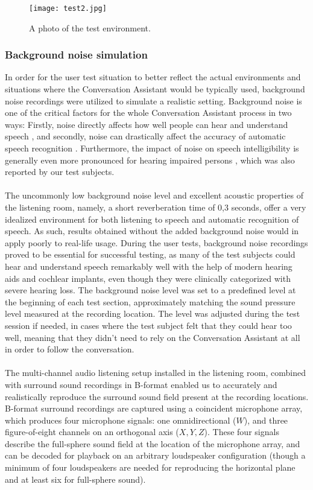 \documentclass[english, 12pt, a4paper, pdftex, elec, utf8]{aaltothesis}
\begin{document}
\begin{figure}[h]
	\centering
	\texttt{[image: test2.jpg]}
	\caption{A photo of the test environment.}
	\label{fig:photo}
\end{figure}

\subsubsection{Background noise simulation}

In order for the user test situation to better reflect the actual environments and situations where the Conversation Assistant would be typically used, background noise recordings were utilized to simulate a realistic setting. Background noise is one of the critical factors for the whole Conversation Assistant process in two ways: Firstly, noise directly affects how well people can hear and understand speech \cite{pulkki2015communication}, and secondly, noise can drastically affect the accuracy of automatic speech recognition \cite{kallasjoki2016}. Furthermore, the impact of noise on speech intelligibility is generally even more pronounced for hearing impaired persons \cite{healy2016difficulty}, which was also reported by our test subjects. \\\\
The uncommonly low background noise level and excellent acoustic properties of the listening room, namely, a short reverberation time of 0,3 seconds, offer a very idealized environment for both listening to speech and automatic recognition of speech. As such, results obtained without the added background noise would in apply poorly to real-life usage. During the user tests, background noise recordings proved to be essential for successful testing, as many of the test subjects could hear and understand speech remarkably well with the help of modern hearing aids and cochlear implants, even though they were clinically categorized with severe hearing loss. The background noise level was set to a predefined level at the beginning of each test section, approximately matching the sound pressure level measured at the recording location. The level was adjusted during the test session if needed, in cases where the test subject felt that they could hear too well, meaning that they didn't need to rely on the Conversation Assistant at all in order to follow the conversation. \\\\
The multi-channel audio listening setup installed in the listening room, combined with surround sound recordings in B-format enabled us to accurately and realistically reproduce the surround sound field present at the recording locations. B-format surround recordings are captured using a coincident microphone array, which produces four microphone signals: one omnidirectional ($W$), and three figure-of-eight channels on an orthogonal axis ($X,Y,Z$). These four signals describe the full-sphere sound field at the location of the microphone array, and can be decoded for playback on an arbitrary loudspeaker configuration (though a minimum of four loudspeakers are needed for reproducing the horizontal plane and at least six for full-sphere sound). \cite{furness1990ambisonics, pulkki2015communication} \\\\
\end{document}
